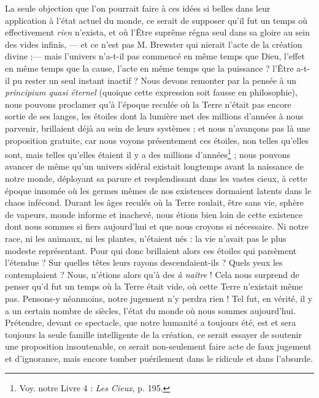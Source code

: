 \documentclass[a4paper, 11pt, oneside, landscape]{article}
\begin{document}
La seule objection que l'on pourrait faire à ces idées si belles dans leur application à l'état actuel du monde, ce serait de supposer qu'il fut un temps où effectivement \emph{rien} n'exista, et où l'Être suprême régna seul dans sa gloire au sein des vides infinis, --- et ce n'est pas M. Brewster qui nierait l'acte de la création divine ;--- mais l'univers n'a-t-il pas commencé en même temps que Dieu, l'effet en même temps que la cause, l'acte en même temps que la puissance ? l'Être a-t-il pu rester un seul instant inactif ? Nous devons remonter par la pensée à un \emph{principium quasi éternel} (quoique cette expression soit fausse en philosophie), nous pouvons proclamer qu'à l'époque reculée où la Terre n'était pas encore sortie de ses langes, les étoiles dont la lumière met des millions d'années à nous parvenir, brillaient déjà au sein de leurs systèmes ; et nous n'avançons pas là une proposition gratuite, car nous voyons présentement ces étoiles, non telles qu'elles sont, mais telles qu'elles étaient il y a des millions d'années\footnote{Voy. notre Livre 4 : \emph{Les Cieux}, p. 195.} ; nous pouvons avancer de même qu'un univers sidéral existait longtemps avant la naissance de notre monde, déployant sa parure et resplendissant dans les vastes cieux, à cette époque innomée où les germes mêmes de nos existences dormaient latents dans le chaos infécond. Durant les âges reculés où la Terre roulait, être sans vie, sphère de vapeurs, monde informe et inachevé, nous étions bien loin de cette existence dont nous sommes si fiers aujourd'hui et que nous croyons si nécessaire. Ni notre race, ni les animaux, ni les plantes, n'étaient nés : la vie n'avait pas le plus modeste représentant. Pour qui donc brillaient alors ces étoiles qui parsèment l'étendue ? Sur quelles têtes leurs rayons descendaient-ils ? Quels yeux les contemplaient ? Nous, n'étions alors qu'à des \emph{à naître} ! Cela nous surprend de penser qu'd fut un temps où la Terre était vide, où cette Terre n'existait même pas. Pensons-y néanmoins, notre jugement n'y perdra rien ! Tel fut, en vérité, il y a un certain nombre de siècles, l'état du monde où nous sommes aujourd'hui. Prétendre, devant ce spectacle, que notre humanité a toujours été, est et sera toujours la seule famille intelligente de la création, ce serait essayer de soutenir une proposition insoutenable, ce serait non-seulement faire acte de faux jugement et d'ignorance, mais encore tomber puérilement dans le ridicule et dans l'absurde.
\end{document}
